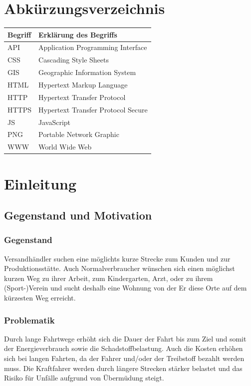 \documentclass[a4paper, twoside, 12pt]{scrreprt}
\begin{document}
\chapter*{Abkürzungsverzeichnis}
\begin{tabularx}{\textwidth}{lX}
\toprule
\textrm{Begriff}                &\textrm{Erklärung des Begriffs}\\
\midrule
API		&Application Programming Interface\\
CSS		&Cascading Style Sheets\\
GIS		&Geographic Information System \\
HTML	&Hypertext Markup Language\\
HTTP	&Hypertext Transfer Protocol\\
HTTPS	&Hypertext Transfer Protocol Secure\\
JS		&JavaScript\\
PNG		&Portable Network Graphic\\
WWW		&World Wide Web\\

\bottomrule
\end{tabularx}

\chapter{Einleitung}
\section{Gegenstand und Motivation}
\subsection{Gegenstand}
Versandhändler suchen eine möglichts kurze Strecke zum Kunden und zur Produktionsstätte.
Auch Normalverbraucher wünschen sich einen möglichst kurzen Weg zu ihrer Arbeit, zum Kindergarten, Arzt, oder zu ihrem (Sport-)Verein und sucht deshalb eine Wohnung von der Er diese Orte auf dem kürzesten Weg erreicht.
\subsection{Problematik}
Durch lange Fahrtwege erhöht sich die Dauer der Fahrt bis zum Ziel und somit der Energieverbrauch sowie die Schadstoffbelastung.
Auch die Kosten erhöhen sich bei langen Fahrten, da der Fahrer und/oder der Treibstoff bezahlt werden muss.
Die Kraftfahrer werden durch längere Strecken stärker belastet und das Risiko für Unfälle aufgrund von Übermüdung steigt.\cite{hoffmann1966belastung}
\end{document}
